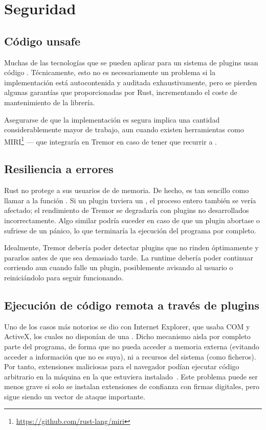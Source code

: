 \section{Seguridad}\label{sec:security}

\subsection{Código unsafe}

Muchas de las tecnologías que se pueden aplicar para un sistema de plugins usan
código \unsafe. Técnicamente, esto no es necesariamente un problema si la
implementación está autocontenida y auditada exhaustivamente, pero se pierden
algunas garantías que proporcionadas por Rust, incrementando el coste de
mantenimiento de la librería.

Asegurarse de que la implementación es segura implica una cantidad
considerablemente mayor de trabajo, aun cuando existen herramientas como
MIRI\footnote{\url{https://github.com/rust-lang/miri}} --- que integraría en
Tremor en caso de tener que recurrir a \unsafe.

\subsection{Resiliencia a errores}

Rust no protege a sus usuarios de \leaks de memoria. De hecho, es tan sencillo
como llamar a la función . Si un plugin tuviera un \leak, el
proceso entero también se vería afectado; el rendimiento de Tremor se degradaría
con plugins no desarrollados incorrectamente. Algo similar podría suceder en
caso de que un plugin abortase o sufriese de un pánico, lo que terminaría la
ejecución del programa por completo.

Idealmente, Tremor debería poder detectar plugins que no rinden óptimamente y
pararlos antes de que sea demasiado tarde. La runtime debería poder continuar
corriendo aun cuando falle un plugin, posiblemente avisando al usuario o
reiniciándolo para seguir funcionando.

\subsection{Ejecución de código remota a través de plugins}

Uno de los casos más notorios se dio con Internet Explorer, que usaba COM y
ActiveX, los cuales no disponían de una \sandbox. Dicho mecanismo aisla por
completo parte del programa, de forma que no pueda acceder a memoria externa
(evitando acceder a información que no es suya), ni a recursos del sistema (como
ficheros). Por tanto, extensiones maliciosas para el navegador podían ejecutar
código arbitrario en la máquina en la que estuviera instalado~\cite{iesandbox}.
Este problema puede ser menos grave si solo se instalan extensiones de confianza
con firmas digitales, pero sigue siendo un vector de ataque importante.

